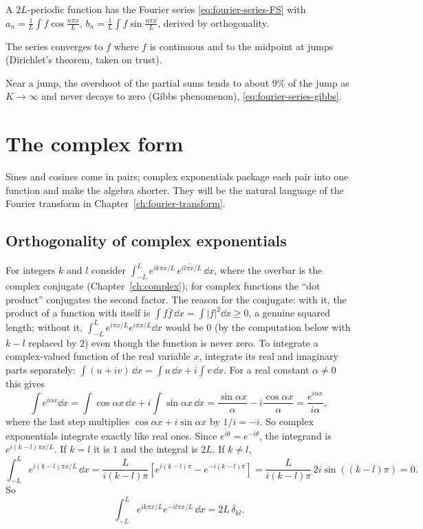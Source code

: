 \begin{keyideas}
\item A $2L$-periodic function has the Fourier series \cref{eq:fourier-series-FS} with $a_n=\frac1L\int f\cos\frac{n\pi x}{L}$, $b_n=\frac1L\int f\sin\frac{n\pi x}{L}$, derived by orthogonality.
\item The series converges to $f$ where $f$ is continuous and to the midpoint at jumps (Dirichlet's theorem, taken on trust).
\item Near a jump, the overshoot of the partial sums tends to about $9\%$ of the jump as $K\to\infty$ and never decays to zero (Gibbs phenomenon), \cref{eq:fourier-series-gibbs}.
\end{keyideas}

\section{The complex form}\label{sec:fourier-series-complex}

Sines and cosines come in pairs; complex exponentials package each pair into one function and make the algebra shorter. They will be the natural language of the Fourier transform in Chapter~\ref{ch:fourier-transform}.

\subsection{Orthogonality of complex exponentials}

For integers $k$ and $l$ consider $\int_{-L}^{L}e^{ik\pi x/L}\,\overline{e^{il\pi x/L}}\,\dd x$, where the overbar is the complex conjugate (Chapter~\ref{ch:complex}); for complex functions the ``dot product'' conjugates the second factor. The reason for the conjugate: with it, the product of a function with itself is $\int f\bar f\,\dd x=\int|f|^2\dd x\ge0$, a genuine squared length; without it, $\int_{-L}^{L}e^{i\pi x/L}e^{i\pi x/L}\dd x$ would be $0$ (by the computation below with $k-l$ replaced by $2$) even though the function is never zero. To integrate a complex-valued function of the real variable $x$, integrate its real and imaginary parts separately: $\int(u+iv)\,\dd x=\int u\,\dd x+i\int v\,\dd x$. For a real constant $\alpha\neq0$ this gives
\[
\int e^{i\alpha x}\dd x=\int\cos\alpha x\,\dd x+i\int\sin\alpha x\,\dd x=\frac{\sin\alpha x}{\alpha}-i\frac{\cos\alpha x}{\alpha}=\frac{e^{i\alpha x}}{i\alpha},
\]
where the last step multiplies $\cos\alpha x+i\sin\alpha x$ by $1/i=-i$. So complex exponentials integrate exactly like real ones. Since $\overline{e^{i\theta}}=e^{-i\theta}$, the integrand is $e^{i(k-l)\pi x/L}$. If $k=l$ it is $1$ and the integral is $2L$. If $k\neq l$,
\begin{equation}
\int_{-L}^{L}e^{i(k-l)\pi x/L}\,\dd x=\frac{L}{i(k-l)\pi}\left[e^{i(k-l)\pi}-e^{-i(k-l)\pi}\right]=\frac{L}{i(k-l)\pi}\,2i\sin((k-l)\pi)=0 .
\end{equation}
So
\begin{equation}
\int_{-L}^{L}e^{ik\pi x/L}e^{-il\pi x/L}\,\dd x=2L\,\delta_{kl}.
\label{eq:fourier-series-orthexp}
\end{equation}

